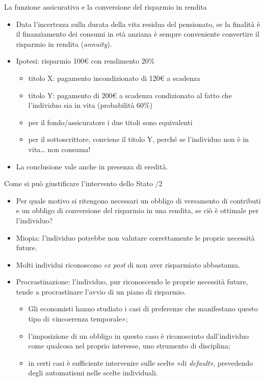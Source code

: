 \documentclass[aspectratio=64,12pt]{beamer}
\begin{document}
\begin{frame}{La funzione assicurativa e la conversione del risparmio in rendita}
\begin{itemize}
\item Data l'incertezza sulla durata della vita residua del pensionato, se la
finalità è il finanziamento dei consumi in età anziana è \alert{sempre}
conveniente convertire il risparmio in rendita (\emph{annuity}).
\item Ipotesi: risparmio 100€ con rendimento 20\%
\begin{itemize}
\item titolo X: pagamento incondizionato di 120€ a scadenza
\item titolo Y: pagamento di 200€ a scadenza condizionato al fatto che
l'individuo sia in vita (probabilità 60\%)
\item per il fondo/assicuratore i due titoli sono equivalenti
\item per il sottoscrittore, conviene il titolo Y, perché se l'individuo non è
in vita\ldots{} non consuma!
\end{itemize}
\item La conclusione vale anche in presenza di eredità.
\end{itemize}
\end{frame}

\begin{frame}{Come si può giustificare l'intervento dello Stato /2}
\begin{itemize}
\item Per quale motivo si ritengono necessari un obbligo di versamento di
  contributi e un obbligo di conversione del risparmio in una rendita, se ciò
  è ottimale per l'individuo?
\item \alert{Miopia}: l'individuo potrebbe non valutare correttamente le proprie
necessità future.
\item Molti individui riconoscono \emph{ex post} di non aver risparmiato abbastanza.
\item \alert{Procrastinazione}: l'individuo, pur riconoscendo le proprie necessità
future, tende a procrastinare l'avvio di un piano di risparmio.
\begin{itemize}
\item Gli economisti hanno studiato i casi di preferenze che manifestano questo
tipo di «incoerenza temporale»;
\item l'imposizione di un obbligo in questo caso è riconosciuto dall'individuo
come qualcosa nel proprio interesse, uno strumento di disciplina;
\item in certi casi è sufficiente intervenire sulle scelte «di \emph{default}»,
prevedendo degli automatismi nelle scelte individuali.
\end{itemize}
\end{itemize}
\end{frame}
\end{document}
